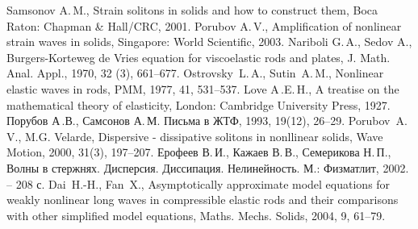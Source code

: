 \documentclass[12pt, a4paper]{report}
\begin{document}
\begin{thebibliography}{99}
	 Samsonov A.\,M., Strain solitons in solids and how to construct them, Boca Raton: Chapman \& Hall/CRC, 2001.
	 Porubov A.\,V., Amplification of nonlinear strain waves in solids, Singapore: World Scientific, 2003.
	 Nariboli G.\,A., Sedov A., Burgers-Korteweg de Vries equation for viscoelastic rods and plates, J. Math. Anal. Appl., 1970, 32 (3), 661--677.
	 Ostrovsky~L.\,A., Sutin~A.\,M., Nonlinear elastic waves in rods, PMM, 1977, 41, 531--537.
	 Love A\,.E.\,H., A treatise on the mathematical theory of elasticity, London: Cambridge University Press, 1927.
	 Порубов А\,.В., Самсонов А.\,М. Письма в ЖТФ, 1993, 19(12), 26--29.
	Porubov~A.\,V., M.G. Velarde, Dispersive - dissipative solitons in nonllinear solids, Wave Motion, 2000, 31(3), 197--207.
	 Ерофеев В.\,И., Кажаев В.\,В., Семерикова Н.\,П., Волны в	стержнях. Дисперсия. Диссипация. Нелинейность. М.: Физматлит, 2002. -- 208 с.
	 Dai~H.-H., Fan~X., Asymptotically approximate model equations for weakly nonlinear long waves in compressible elastic rods and their comparisons with other simplified model equations, Maths. Mechs. Solids, 2004, 9, 61--79.

\end{thebibliography}
\end{document}
